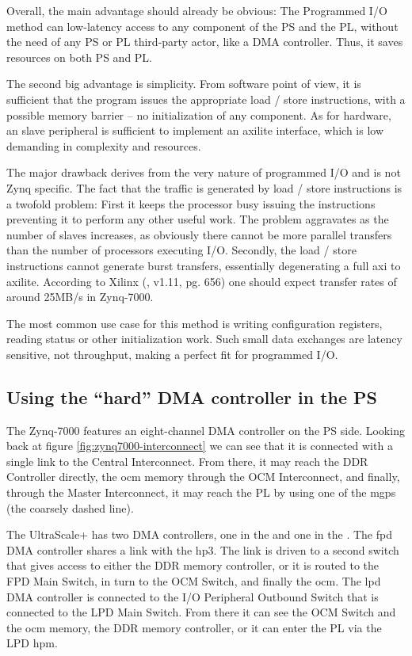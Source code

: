 Overall, the main advantage should already be obvious:
The Programmed I/O method can low-latency access to any component of the PS and the PL,
without the need of any PS or PL third-party actor, like a DMA controller. Thus, it saves
resources on both PS and PL.

The second big advantage is simplicity. From software point of view, 
it is sufficient that the program issues the appropriate load / store instructions,
with a possible memory barrier -- no initialization of any component.
As for hardware, an slave peripheral is sufficient to
implement an \gls{axilite} interface, which is low demanding in complexity and resources.

The major drawback derives from the very nature of programmed I/O and is not Zynq specific.
The fact that the traffic is generated by load / store instructions is a twofold problem:
First it keeps the processor busy issuing the instructions preventing it 
to perform any other useful work. The problem aggravates as the number of slaves increases,
as obviously there cannot be more parallel transfers than the number of processors executing I/O.
Secondly, the load / store instructions cannot generate \gls{burst} transfers,
essentially degenerating a full \gls{axi} to \gls{axilite}. 
According to Xilinx (\cite{ug585}, v1.11, pg. 656) one should expect 
transfer rates of around 25MB/s in Zynq-7000.

The most common use case for this method is writing configuration registers,
reading status or other initialization work. 
Such small data exchanges are latency sensitive, not throughput,
making a perfect fit for programmed I/O.

\subsection{Using the ``hard'' DMA controller in the PS}

The Zynq-7000 features an eight-channel DMA controller on the PS side.
Looking back at figure \ref{fig:zynq7000-interconnect} we can see that it is connected
with a single link to the Central Interconnect. 
From there, it may reach the DDR Controller directly, the \gls{ocm} memory through the
OCM Interconnect, and finally, through the Master Interconnect, it may reach the PL by
using one of the \glspl{mgp} (the coarsely dashed line). 

The UltraScale+ has two DMA controllers, one in the  and one
in the . 
The \gls{fpd} DMA controller shares a link with the \gls{hp}3. The link
is driven to a second switch that gives access to either the DDR memory controller,
or it is routed to the FPD Main Switch, in turn to the OCM Switch, and finally the \gls{ocm}.
The \gls{lpd} DMA controller is connected to the I/O Peripheral Outbound Switch that is
connected to the LPD Main Switch. From there it can see the OCM Switch and the \gls{ocm} memory,
the DDR memory controller, or it can enter the PL via the LPD \gls{hpm}.

